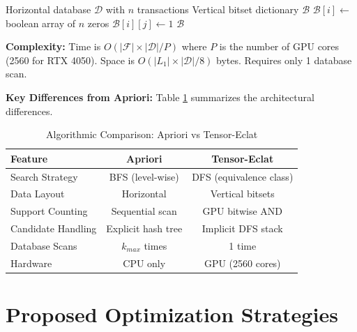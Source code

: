 \documentclass[conference]{IEEEtran}
\begin{document}
\begin{algorithm}[htbp]
\caption{Horizontal-to-Vertical Conversion}
\label{alg:convert}
\begin{algorithmic}[1]
\REQUIRE Horizontal database $\mathcal{D}$ with $n$ transactions
\ENSURE Vertical bitset dictionary $\mathcal{B}$
    \STATE $\mathcal{B}[i] \leftarrow$ boolean array of $n$ zeros
\ENDFOR
{}
        \STATE $\mathcal{B}[i][j] \leftarrow 1$
    \ENDFOR
\ENDFOR
\RETURN $\mathcal{B}$
\end{algorithmic}
\end{algorithm}

\textbf{Complexity:} Time is $O(|\mathcal{F}| \times |\mathcal{D}| / P)$ where $P$ is the number of GPU cores (2560 for RTX 4050). Space is $O(|L_1| \times |\mathcal{D}| / 8)$ bytes. Requires only 1 database scan.

\textbf{Key Differences from Apriori:} Table \ref{tab:algo_compare} summarizes the architectural differences.

\begin{table}[htbp]
\caption{Algorithmic Comparison: Apriori vs Tensor-Eclat}
\centering
\footnotesize
\begin{tabular}{@{}lcc@{}}
\toprule
\textbf{Feature} & \textbf{Apriori} & \textbf{Tensor-Eclat} \\ \midrule
Search Strategy & BFS (level-wise) & DFS (equivalence class) \\
Data Layout & Horizontal & Vertical bitsets \\
Support Counting & Sequential scan & GPU bitwise AND \\
Candidate Handling & Explicit hash tree & Implicit DFS stack \\
Database Scans & $k_{max}$ times & 1 time \\
Hardware & CPU only & GPU (2560 cores) \\
\bottomrule
\end{tabular}
\label{tab:algo_compare}
\end{table}

\section{Proposed Optimization Strategies}
\end{document}

